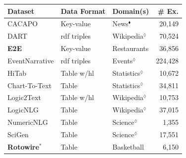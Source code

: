 {\begin{table}[t]
    \centering\small
    \begin{tabular}{@{}lllr@{}}
        \toprule
        \textbf{Dataset}                                                                           & \textbf{Data Format} & \textbf{Domain(s)}      & \textbf{\# Ex.} \\  \midrule
        CACAPO \cite{vanderleeCACAPODatasetMultilingual2020}                                       & Key-value            & News$^\blacklozenge$    & 20,149          \\
        DART \cite{nan2021dart}                                                                    & \acs{rdf} triples    & Wikipedia$^\lozenge$    & 70,524          \\
        \textbf{E2E} \cite{dusekSemanticNoiseMatters2019,dusekEvaluatingStateoftheartEndtoEnd2020} & Key-value            & Restaurants             & 36,856          \\
        EventNarrative \cite{colas2021eventnarrative}                                              & \acs{rdf} triples    & Events$^\lozenge$       & 224,428         \\
        HiTab \cite{chengHiTabHierarchicalTable2021}                                               & Table w/hl           & Statistics$^\lozenge$   & 10,672          \\
        Chart-To-Text \cite{kantharajCharttoTextLargeScaleBenchmark2022}                           & Table                & Statistics$^\lozenge$   & 34,811          \\
        Logic2Text \cite{chenLogic2TextHighFidelityNatural2020}                                    & Table w/hl           & Wikipedia$^\lozenge$    & 10,753          \\
        LogicNLG \cite{chenLogicalNaturalLanguage2020}                                             & Table                & Wikipedia$^\lozenge$    & 37,015          \\
        NumericNLG \cite{suadaaTabletoTextGenerationNumerical2021}                                 & Table                & Science$^\lozenge$      & 1,355           \\
        SciGen \cite{moosaviLearningReasonText2021}                                                & Table                & Science$^\lozenge$      & 17,551          \\
        \textbf{Rotowire}$^*$ \cite{wiseman2017challenges}                                         & Table                & Basketball              & 6,150           \\

\end{tabular}
\end{table}}

